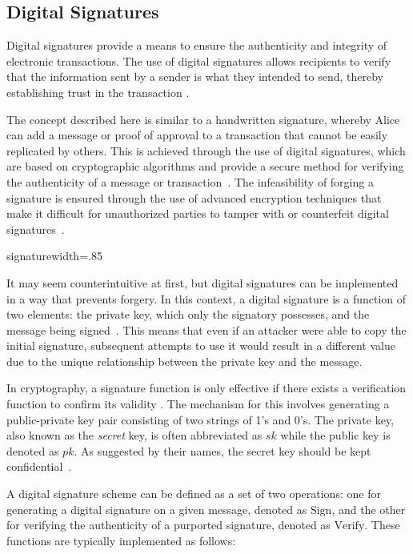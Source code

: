 \subsection{Digital Signatures}
Digital signatures provide a means to ensure the authenticity and integrity of electronic transactions. The use of digital signatures allows
recipients to verify that the information sent by a sender is what they intended to send, thereby establishing trust in the transaction
\cite{stinson2018cryptography}.

The concept described here is similar to a handwritten signature, whereby Alice can add a message or proof of approval to a transaction that
cannot be easily replicated by others. This is achieved through the use of digital signatures, which are based on cryptographic algorithms and
provide a secure method for verifying the authenticity of a message or transaction~\cite{elgamal1985public}. The infeasibility of forging a
signature is ensured through the use of advanced encryption techniques that make it difficult for unauthorized parties to tamper with or
counterfeit digital signatures~\cite{elgamal1985public}.

{signature}{width=.85\textwidth}%

It may seem counterintuitive at first, but digital signatures can be implemented in a way that prevents forgery. In this context, a digital
signature is a function of two elements: the private key, which only the signatory possesses, and the message being signed~\cite{diffie2022new}.
This means that even if an attacker were able to copy the initial signature, subsequent attempts to use it would result in a different value
due to the unique relationship between the private key and the message.

In cryptography, a signature function is only effective if there exists a verification function to confirm its validity
\cite{stallings2006cryptography}. The mechanism for this involves generating a public-private key pair consisting of two strings of 1's and
0's. The private key, also known as the \textit{secret} key, is often abbreviated as $sk$ while the public key is denoted as $pk$. As
suggested by their names, the secret key should be kept confidential~\cite{dss}.

A digital signature scheme can be defined as a set of two operations: one for generating a digital signature on a given message, denoted as
$\text{Sign}$, and the other for verifying the authenticity of a purported signature, denoted as $\text{Verify}$. These functions are typically
implemented as follows:

